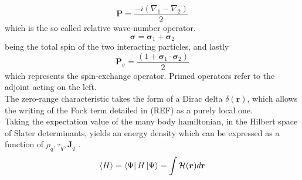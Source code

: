 \begin{equation}
\mathbf{P} = \frac{-i(\nabla_1 - \nabla_2)}{2}
\end{equation}
which is the so called relative wave-number operator.
\begin{equation}
\boldsymbol{\sigma} = \boldsymbol{\sigma}_1 + \boldsymbol{\sigma}_2
\end{equation}
being the total spin of the two interacting particles, and lastly
\begin{equation}
    \mathbf{P}_\sigma = \frac{(1+\boldsymbol{\sigma}_1\cdot\boldsymbol{\sigma}_2)}{2}
\end{equation}
which represents the spin-exchange operator.
Primed operators refer to the adjoint acting on the left.
\\The zero-range characteristic takes the form of a Dirac delta $\delta(\mathbf r)$, which allows the writing of the Fock term detailed in (REF) as a purely local one.
\\Taking the expectation value of the many body hamiltonian, in the Hilbert space of Slater determinants, yields an energy density which can be expressed as a function of $\rho_q, \tau_q, \bm J_q$ \cite{VauhBrinkOriginal}.
\begin{equation}
    \label{eq:skyrme_int_en_dens}
    \expval{H} = \bra{\Psi} H \ket{\Psi} = \int \mathcal H(\bm r) d\mathbf r
\end{equation}
